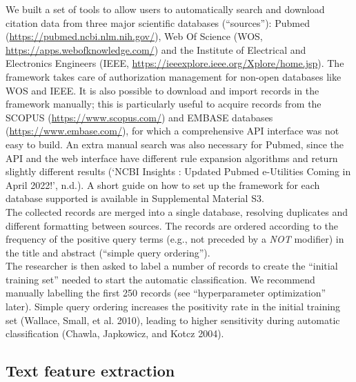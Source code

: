 \documentclass{article}
\begin{document}
We built a set of tools to allow users to automatically search and
download citation data from three major scientific databases
(``sources''): Pubmed (\url{https://pubmed.ncbi.nlm.nih.gov/}), Web Of
Science (WOS, \url{https://apps.webofknowledge.com/}) and the Institute
of Electrical and Electronics Engineers (IEEE,
\url{https://ieeexplore.ieee.org/Xplore/home.jsp}). The framework takes
care of authorization management for non-open databases like WOS and
IEEE. It is also possible to download and import records in the
framework manually; this is particularly useful to acquire records from
the SCOPUS (\url{https://www.scopus.com/}) and EMBASE databases
(\url{https://www.embase.com/}), for which a comprehensive API interface
was not easy to build. An extra manual search was also necessary for
Pubmed, since the API and the web interface have different rule
expansion algorithms and return slightly different results ({`NCBI
Insights : Updated Pubmed e-Utilities Coming in April 2022!'}, n.d.). A
short guide on how to set up the framework for each database supported
is available in Supplemental Material S3.\\
The collected records are merged into a single database, resolving
duplicates and different formatting between sources. The records are
ordered according to the frequency of the positive query terms (e.g.,
not preceded by a \emph{NOT} modifier) in the title and abstract
(``simple query ordering'').\\
The researcher is then asked to label a number of records to create the
``initial training set'' needed to start the automatic classification.
We recommend manually labelling the first 250 records (see
``hyperparameter optimization'' later). Simple query ordering increases
the positivity rate in the initial training set (Wallace, Small, et al.
2010), leading to higher sensitivity during automatic classification
(Chawla, Japkowicz, and Kotcz 2004).

\hypertarget{text-feature-extraction}{%
\subsection{Text feature extraction}\label{text-feature-extraction}}
\end{document}
